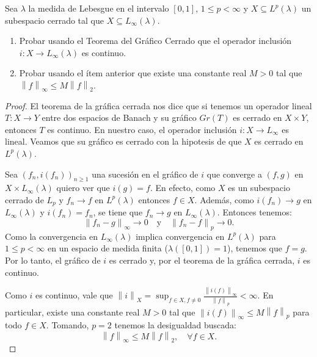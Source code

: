 \documentclass{article}
\theoremstyle{definition}
\newcommand{\norm}[1]{\left\lVert #1 \right\rVert}       %
\newenvironment{ejercicio}[1]{\begin{trivlist}
\item[\hskip \labelsep {\bfseries Ejercicio}\hskip \labelsep {\bfseries #1.}]}{\end{trivlist}}
\begin{document}
\begin{ejercicio}{12}
    Sea \( \lambda \) la medida de Lebesgue en el intervalo \([0,1]\), \( 1 \le p < \infty \) y \( X \subseteq L^{p}(\lambda)\) un subespacio cerrado tal que \(X\subseteq L_{\infty}(\lambda)\).
    \begin{enumerate}
        \item Probar usando el Teorema del Gráfico Cerrado que el operador inclusión \(i:X\to L_{\infty}(\lambda)\) es continuo.
        \item Probar usando el ítem anterior que existe una constante real \( M>0 \) tal que \(\norm{f}_{\infty}\le M\norm{f}_{2}\).
    \end{enumerate}
\end{ejercicio}
\begin{proof}
    El teorema de la gráfica cerrada nos dice que si tenemos un operador lineal \( T: X \to Y \) entre dos espacios de Banach y su gráfico \( Gr(T) \) es cerrado en \( X \times Y \), entonces \( T \) es continuo. En nuestro caso, el operador inclusión \( i: X \to L_{\infty} \) es lineal. Veamos que su gráfico es cerrado con la hipotesis de que \( X \) es cerrado en \( L^p(\lambda) \).

    Sea \( {(f_n, i(f_n))}_{n\ge1} \) una sucesión en el gráfico de \( i \) que converge a \( (f, g) \) en \( X \times L_{\infty}(\lambda) \) quiero ver que \( i(g) = f \). En efecto, como \( X \) es un subespacio cerrado de \( L_p \) y \( f_n \to f \) en \( L^p(\lambda) \) entonces \( f \in X \). Además, como \( i(f_n) \to g \) en \( L_{\infty}(\lambda) \) y \( i(f_n) = f_n \), se tiene que \( f_n \to g \) en \( L_{\infty}(\lambda) \). Entonces tenemos:\[
        \norm{f_n - g}_\infty \to 0 \quad \text{y} \quad \norm{f_n - f}_p \to 0.
    \]
    Como la convergencia en \(L_{\infty}(\lambda)\) implica convergencia en \( L^p(\lambda) \) para \( 1 \le p < \infty \) en un espacio de medida finita (\( \lambda([0, 1]) = 1 \)), tenemos que \(f = g\). Por lo tanto, el gráfico de \(i\) es cerrado y, por el teorema de la gráfica cerrada, \(i\) es continuo.

    Como \( i \) es continuo, vale que \( \norm{i}_{X} = \sup_{f \in X, f \neq 0} \frac{\norm{i(f)}_{\infty}}{\norm{f}_p} < \infty \). En particular, existe una constante real \( M > 0 \) tal que \(\norm{i(f)}_{\infty} \le M \norm{f}_p\) para todo \( f \in X \).
    Tomando, \( p = 2 \) tenemos la desigualdad buscada:
    \[
        \norm{f}_{\infty} \le M \norm{f}_{2}, \quad \forall f \in X.
    \]
\end{proof}
\end{document}
